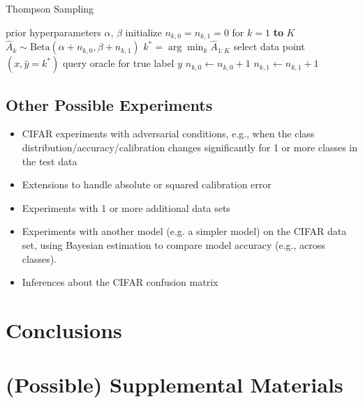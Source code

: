 \documentclass{article}
\begin{document}
\begin{algorithm}[tb]
   \caption{Thompson Sampling}
   \label{alg:thompson}
\begin{algorithmic}
	 prior hyperparameters $\alpha$, $\beta$
	\STATE initialize $n_{k,0}=n_{k,1}=0$ for $k=1$ {\bfseries to} $K$
	\REPEAT
        \STATE $\hat{A}_{k} \sim \text{Beta}(\alpha + n_{k,0}, \beta + n_{k,1})$
	\ENDFOR
	\STATE $k^{*} = \arg \min_k \hat{A}_{1:K}$
    \STATE select data point $(x, \hat{y}=k^{*})$
    \STATE query oracle for true label $y$
        \STATE $n_{k,0} \leftarrow n_{k,0} + 1$
	\ELSE
        \STATE $n_{k,1} \leftarrow n_{k,1} + 1$
    \ENDIF
\end{algorithmic}
\end{algorithm}



\subsection{Other Possible Experiments}
\begin{itemize}
   \item CIFAR experiments with adversarial conditions, e.g., when the class distribution/accuracy/calibration changes significantly for 1 or more classes in the test data
   \item Extensions to handle absolute or squared calibration error
    \item Experiments with 1 or more additional data sets
    \item Experiments with another model (e.g. a simpler model) on the CIFAR data set, using Bayesian estimation to compare model accuracy (e.g., across classes).
    \item Inferences about the CIFAR confusion matrix
\end{itemize}
\section{Conclusions}

\newpage
\phantom{p}
\newpage




\newpage
\phantom{p}
\newpage


\section*{(Possible) Supplemental Materials}
\end{document}
